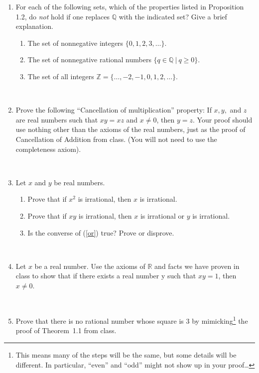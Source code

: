 \documentclass[12pt]{amsart}
\newcommand{\Q}{\mathbb{Q}}
\newcommand{\Z}{\mathbb{Z}}
\newcommand{\R}{\mathbb{R}}
\begin{document}
\begin{enumerate}
\item For each of the following sets, which of the properties listed in Proposition 1.2, do \emph{not} hold if one replaces $\mathbb{Q}$ with the indicated set? Give a brief explanation. 
\begin{enumerate}
\item The set of nonnegative integers $\{0, 1, 2, 3, \dots\}$.
\item The set of nonnegative rational numbers $\{q \in \Q \ | \ q \geq 0\}$.
\item The set of all integers $\Z = \{\dots,-2,-1,0,1,2,\dots\}$.
\end{enumerate}

\

\item Prove the following ``Cancellation of multiplication'' property: If $x, y,$ and $z$ are real numbers such that $xy = xz$ and $x\neq 0$, then $y = z$. Your proof should use nothing other than the axioms of the real numbers, just as the proof of Cancellation of Addition from class. (You will not need to use the completeness axiom).

\


\item Let $x$ and $y$ be real numbers. 
\begin{enumerate}
\item Prove that if $x^2$ is irrational, then $x$ is irrational.
\item\label{or} Prove that if $xy$ is irrational, then $x$ is irrational or $y$ is irrational.
\item Is the converse of (\ref{or}) true? Prove or disprove.
\end{enumerate}

\

\item Let $x$ be a real number. Use the axioms of $\R$ and facts we have proven in class to show that if there exists a real number y such that $xy = 1$, then $x\neq 0$.

\


\item\label{sqrt3} Prove that there is no rational number whose square is 3 by mimicking\footnote{This means many of the steps will be the same, but some details will be different. In particular, ``even'' and ``odd'' might not show up in your proof\dots} the proof of Theorem~1.1 from class.


\end{enumerate}
\end{document}
